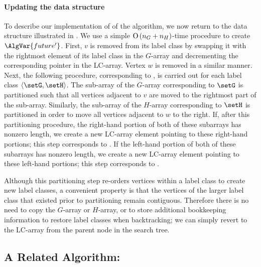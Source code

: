 \paragraph{Updating the data structure}
To describe
our implementation of  of the algorithm,
we now return to the data structure illustrated in .
We use a simple $\operatorname{O}\left(n_G+n_H\right)$-time procedure to create $\AlgVar{future'}$.
First, $v$ is removed from its label class by swapping it with the rightmost
element of its label class in the $G$-array and decrementing the corresponding
pointer in the LC-array. Vertex $w$ is removed in a similar manner.
Next, the following procedure, corresponding to ,
is carried out for each label class $\langle \setG,\setH \rangle$.  The sub-array
of the $G$-array corresponding to $\setG$ is partitioned such that all vertices adjacent to $v$ are moved to
the rightmost part of the sub-array. Similarly, the sub-array of the $H$-array corresponding to $\setH$
is partitioned in order to move all vertices adjacent to $w$ to the right.
If, after this partitioning procedure, the right-hand portion of both of these subarrays
has nonzero length, we create a new LC-array element pointing to these right-hand portions;
this step corresponds to .
If the left-hand portion of both of these subarrays
has nonzero length, we create a new LC-array element pointing to these left-hand portions;
this step corresponds to .

Although this partitioning step re-orders vertices within a label class
to create new label classes, a convenient property is that the vertices
of the larger label class that existed prior to partitioning remain contiguous.
Therefore there is no need
to copy the $G$-array or $H$-array, or to store additional bookkeeping information
to restore label classes when backtracking; we can simply revert to the
LC-array from the parent node in the search tree.

\subsection{A Related Algorithm: \citet{DBLP:journals/jacm/SchmidtD76}}

